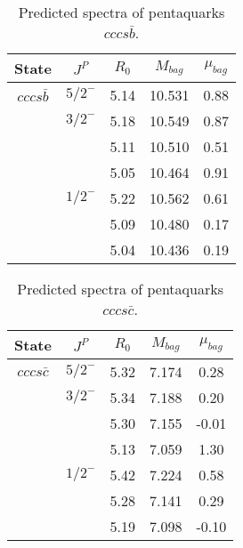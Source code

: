 \documentclass[prd,twocolumn,floatfix,nofootinbib]{revtex4}
\begin{document}
\renewcommand{\tabcolsep}{0.5cm}
\renewcommand{\arraystretch}{1.2}
\begin{table*}[!htbp]
    \caption{Predicted spectra of pentaquarks $cccs\bar{b}$.}
    \begin{tabular}{ccccc}
        \hline\hline
        {\rm State} &$J^{P}$ &$R_{0}$ &$M_{bag}$ &$\mu_{bag}$ \\ \hline
        ${cccs\bar{b}}$
            &${5/2}^{-}$    &5.14   &10.531 &0.88 \\
            &${3/2}^{-}$    &5.18   &10.549 &0.87 \\
            &               &5.11   &10.510 &0.51 \\
            &               &5.05   &10.464 &0.91 \\
            &${1/2}^{-}$    &5.22   &10.562 &0.61 \\
            &               &5.09   &10.480 &0.17 \\
            &               &5.04   &10.436 &0.19 \\
        \hline\hline 
    \end{tabular}
\end{table*}

\renewcommand{\tabcolsep}{0.5cm}
\renewcommand{\arraystretch}{1.2}
\begin{table*}[!htbp]
    \caption{Predicted spectra of pentaquarks $cccs\bar{c}$.}
    \begin{tabular}{ccccc}
        \hline\hline
        {\rm State} &$J^{P}$ &$R_{0}$ &$M_{bag}$ &$\mu_{bag}$ \\ \hline
        ${cccs\bar{c}}$
            &${5/2}^{-}$    &5.32   &7.174  &0.28 \\
            &${3/2}^{-}$    &5.34   &7.188  &0.20 \\
            &               &5.30   &7.155  &-0.01 \\
            &               &5.13   &7.059  &1.30 \\
            &${1/2}^{-}$    &5.42   &7.224  &0.58 \\
            &               &5.28   &7.141  &0.29 \\
            &               &5.19   &7.098  &-0.10 \\
        \hline\hline 
    \end{tabular}
\end{table*}
\end{document}
